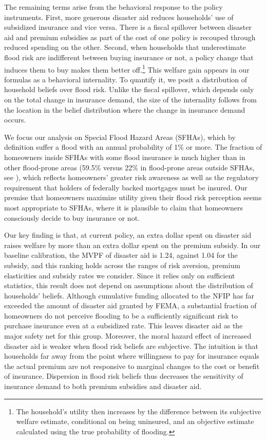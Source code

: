 \documentclass[12pt]{article}
\begin{document}
The remaining terms arise from the behavioral response to the policy instruments. First,  more generous disaster aid reduces households' use of subsidized insurance and vice versa. There is a fiscal spillover between disaster aid and premium subsidies as part of the cost of one policy is recouped through reduced spending on the other. Second, when households that underestimate flood risk are indifferent between buying insurance or not, a policy change that induces them to buy makes them better off.\footnote{The household's utility then increases by the difference between its subjective welfare estimate, conditional on being uninsured, and an objective estimate calculated using the true probability of flooding.}  This welfare gain appears in our formulas as a behavioral internality. To quantify it, we posit a distribution of household beliefs over flood risk. Unlike the fiscal spillover, which depends only on the total change in insurance demand, the size of the internality follows from the location in the belief distribution where the change in insurance demand occurs.

We focus our analysis on Special Flood Hazard Areas (SFHAs), which by definition suffer a flood with an annual probability of 1\% or more. The fraction of homeowners inside SFHAs with some flood insurance is much higher than in other flood-prone areas (59.5\% versus 22\% in flood-prone areas outside SFHAs, see \citealp{amornsiripanitch2025measuring}), which reflects homeowners' greater risk awareness as well as the regulatory requirement that holders of federally backed mortgages must be insured. Our premise that homeowners maximize utility given their flood risk perception seems most appropriate to SFHAs, where it is plausible to claim that homeowners consciously decide to buy insurance or not.  

Our key finding is that, at current policy, an extra dollar spent on disaster aid raises welfare by more than an extra dollar spent on the premium subsidy. In our baseline calibration, the MVPF of disaster aid is 1.24, against 1.04 for the subsidy, and this ranking holds across the ranges of risk aversion, premium elasticities and subsidy rates we consider. Since it relies only on sufficient statistics, this result does not depend on assumptions about the distribution of households' beliefs. Although cumulative funding allocated to the NFIP has far exceeded the amount of disaster aid granted by FEMA, a substantial fraction of homeowners do not perceive flooding to be a sufficiently significant risk to purchase insurance even at a subsidized rate. This leaves disaster aid as the major safety net for this group. Moreover, the moral hazard effect of increased disaster aid is weaker when flood risk beliefs are subjective. The intuition is that households far away from the point where willingness to pay for insurance equals the actual premium are not responsive to marginal changes to the cost or benefit of insurance. Dispersion in flood risk beliefs thus decreases the sensitivity of insurance demand to both premium subsidies and disaster aid.
\end{document}
